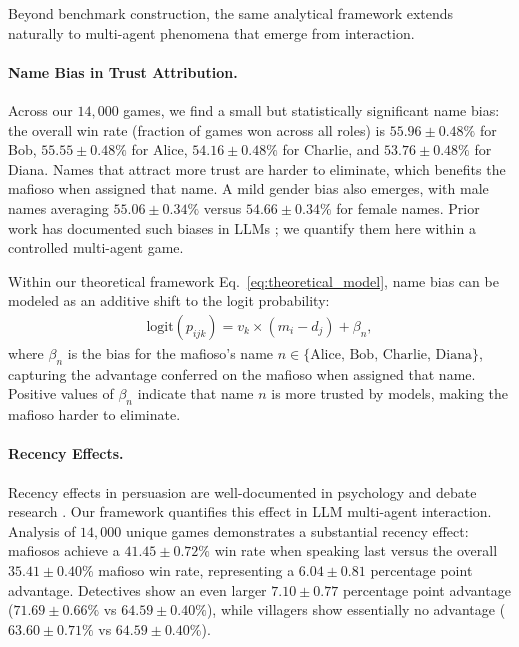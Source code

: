 \documentclass[sigconf,anonymous,balance=false]{aamas}
\begin{document}
Beyond benchmark construction, the same analytical framework extends naturally to multi-agent phenomena that emerge from interaction.

\paragraph{Name Bias in Trust Attribution.}

Across our $14{,}000$ games, we find a small but statistically significant name bias: the overall win rate (fraction of games won across all roles) is $55.96\pm 0.48\%$ for Bob, $55.55\pm 0.48\%$ for Alice, $54.16\pm 0.48\%$ for Charlie, and $53.76\pm 0.48\%$ for Diana. Names that attract more trust are harder to eliminate, which benefits the mafioso when assigned that name. A mild gender bias also emerges, with male names averaging $55.06 \pm 0.34\%$ versus $54.66 \pm 0.34\%$ for female names. Prior work has documented such biases in LLMs \citep{bai2024social}; we quantify them here within a controlled multi-agent game.

Within our theoretical framework Eq.~\ref{eq:theoretical_model}, name bias can be modeled as an additive shift to the logit probability:
\begin{align}
\text{logit}(p_{ijk}) = v_k \times (m_i - d_j) + \beta_n,
\label{eq:model_with_name_bias}
\end{align}
where $\beta_n$ is the bias for the mafioso's name $n \in \{\text{Alice, Bob, Charlie, Diana}\}$, capturing the advantage conferred on the mafioso when assigned that name. Positive values of $\beta_n$ indicate that name $n$ is more trusted by models, making the mafioso harder to eliminate.

\paragraph{Recency Effects.}

Recency effects in persuasion are well-documented in psychology and debate research \citep{miller1964}. Our framework quantifies this effect in LLM multi-agent interaction. Analysis of $14,000$ unique games demonstrates a substantial recency effect: mafiosos achieve a $41.45 \pm 0.72\%$ win rate when speaking last versus the overall $35.41 \pm 0.40\%$ mafioso win rate, representing a $6.04 \pm 0.81$ percentage point advantage. Detectives show an even larger $7.10 \pm 0.77$ percentage point advantage ($71.69 \pm 0.66\%$ vs $64.59 \pm 0.40\%$), while villagers show essentially no advantage ($63.60 \pm 0.71\%$ vs $64.59 \pm 0.40\%$).
\end{document}
